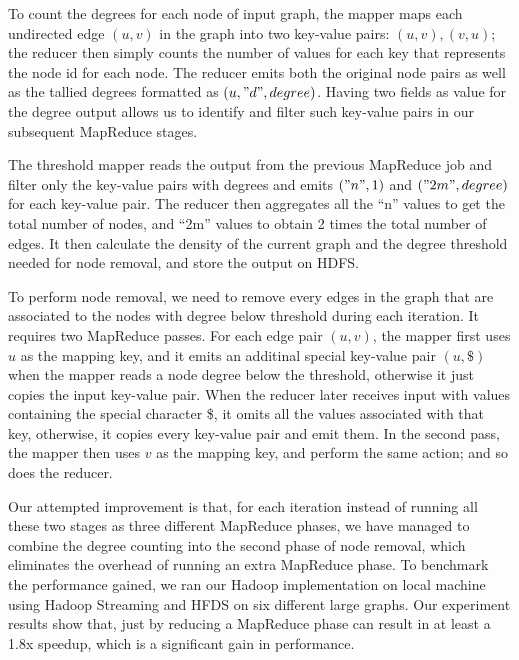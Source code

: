 \documentclass{article}
\begin{document}
To count the degrees for each node of input graph, the mapper maps each undirected edge $(u,v)$ in the graph into two key-value pairs: $(u, v), (v, u)$; the reducer then simply counts the number of values for each key that represents the node id for each node. The reducer emits both the original node pairs as well as the tallied degrees formatted as $(u, "d", degree)$. Having two fields as value for the degree output allows us to identify and filter such key-value pairs in our subsequent MapReduce stages.

The threshold mapper reads the output from the previous MapReduce job and filter only the key-value pairs with degrees and emits $("n", 1)$ and $("2m", degree)$ for each key-value pair. The reducer then aggregates all the ``n'' values to get the total number of nodes, and ``2m'' values to obtain 2 times the total number of edges. It then calculate the density of the current graph and the degree threshold needed for node removal, and store the output on HDFS.

To perform node removal, we need to remove every edges in the graph that are associated to the nodes with degree below threshold during each iteration. It requires two MapReduce passes. For each edge pair $(u,v)$, the mapper first uses $u$ as the mapping key, and it emits an additinal special key-value pair $(u, \$)$ when the mapper reads a node degree below the threshold, otherwise it just copies the input key-value pair. When the reducer later receives input with values containing the special character \$, it omits all the values associated with that key, otherwise, it copies every key-value pair and emit them. In the second pass, the mapper then uses $v$ as the mapping key, and perform the same action; and so does the reducer.

Our attempted improvement is that, for each iteration instead of running all these two stages as three different MapReduce phases, we have managed to combine the degree counting into the second phase of node removal, which eliminates the overhead of running an extra MapReduce phase. To benchmark the performance gained, we ran our Hadoop implementation on local machine using Hadoop Streaming and HFDS on six different large graphs. Our experiment results show that, just by reducing a MapReduce phase can result in at least a 1.8x speedup, which is a significant gain in performance. 
\end{document}
